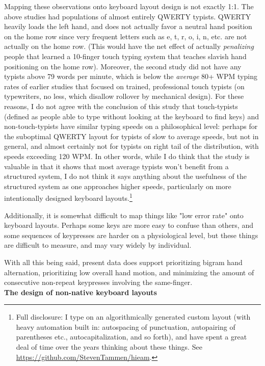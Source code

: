 \documentclass[11pt]{article}
\begin{document}
Mapping these observations onto keyboard layout design is not exactly 1:1. The above studies had populations of almost entirely QWERTY typists. QWERTY heavily loads the left hand, and does not actually favor a neutral hand position on the home row since very frequent letters such as e, t, r, o, i, n, etc. are not actually on the home row. (This would have the net effect of actually \emph{penalizing} people that learned a 10-finger touch typing system that teaches slavish hand positioning on the home row). Moreover, the second study did not have any typists above 79 words per minute, which is below the \emph{average} 80+ WPM typing rates of earlier studies that focused on trained, professional touch typists (on typewriters, no less, which disallow rollover by mechanical design). For these reasons, I do not agree with the conclusion of this study that touch-typists (defined as people able to type without looking at the keyboard to find keys) and non-touch-typists have similar typing speeds on a philosophical level: perhaps for the suboptimal QWERTY layout for typists of slow to average speeds, but not in general, and almost certainly not for typists on right tail of the distribution, with speeds exceeding 120 WPM. In other words, while I do think that the study is valuable in that it shows that most average typists won't benefit from a structured system, I do not think it says anything about the usefulness of the structured system as one approaches higher speeds, particularly on more intentionally designed keyboard layouts.\footnote{Full disclosure: I type on an algorithmically generated custom layout (with heavy automation built in: autospacing of punctuation, autopairing of parentheses etc., autocapitalization, and so forth), and have spent a great deal of time over the years thinking about these things. See \url{https://github.com/StevenTammen/hieam}.}

Additionally, it is somewhat difficult to map things like "low error rate" onto keyboard layouts. Perhaps some keys are more easy to confuse than others, and some sequences of keypresses are harder on a physiological level, but these things are difficult to measure, and may vary widely by individual.

With all this being said, present data does support prioritizing bigram hand alternation, prioritizing low overall hand motion, and minimizing the amount of consecutive non-repeat keypresses involving the same-finger. \\

\noindent \textbf{The design of non-native keyboard layouts} \\
\end{document}

